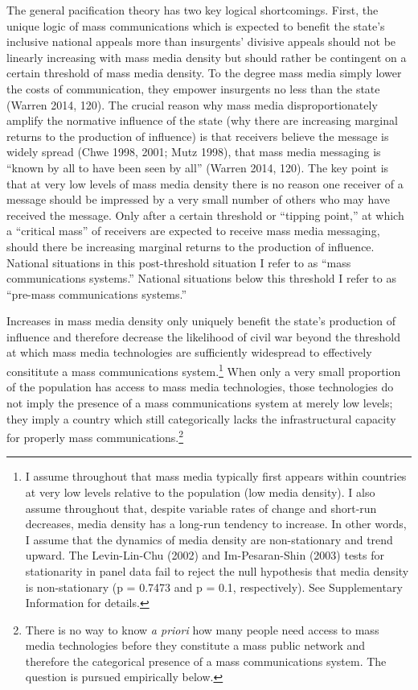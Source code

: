 \documentclass[12pt,article,oneside]{memoir}
\begin{document}
The general pacification theory has two key logical shortcomings. First,
the unique logic of mass communications which is expected to benefit the
state's inclusive national appeals more than insurgents' divisive
appeals should not be linearly increasing with mass media density but
should rather be contingent on a certain threshold of mass media
density. To the degree mass media simply lower the costs of
communication, they empower insurgents no less than the state (Warren
2014, 120). The crucial reason why mass media disproportionately amplify
the normative influence of the state (why there are increasing marginal
returns to the production of influence) is that receivers believe the
message is widely spread (Chwe 1998, 2001; Mutz 1998), that mass media
messaging is ``known by all to have been seen by all'' (Warren 2014,
120). The key point is that at very low levels of mass media density
there is no reason one receiver of a message should be impressed by a
very small number of others who may have received the message. Only
after a certain threshold or ``tipping point,'' at which a ``critical
mass'' of receivers are expected to receive mass media messaging, should
there be increasing marginal returns to the production of influence.
National situations in this post-threshold situation I refer to as
``mass communications systems.'' National situations below this
threshold I refer to as ``pre-mass communications systems.''

Increases in mass media density only uniquely benefit the state's
production of influence and therefore decrease the likelihood of civil
war beyond the threshold at which mass media technologies are
sufficiently widespread to effectively consititute a mass communications
system.\footnote{I assume throughout that mass media typically first
  appears within countries at very low levels relative to the population
  (low media density). I also assume throughout that, despite variable
  rates of change and short-run decreases, media density has a long-run
  tendency to increase. In other words, I assume that the dynamics of
  media density are non-stationary and trend upward. The Levin-Lin-Chu
  (2002) and Im-Pesaran-Shin (2003) tests for stationarity in panel data
  fail to reject the null hypothesis that media density is
  non-stationary (p = 0.7473 and p = 0.1, respectively). See
  Supplementary Information for details.} When only a very small
proportion of the population has access to mass media technologies,
those technologies do not imply the presence of a mass communications
system at merely low levels; they imply a country which still
categorically lacks the infrastructural capacity for properly mass
communications.\footnote{There is no way to know \emph{a priori} how
  many people need access to mass media technologies before they
  constitute a mass public network and therefore the categorical
  presence of a mass communications system. The question is pursued
  empirically below.}
\end{document}
